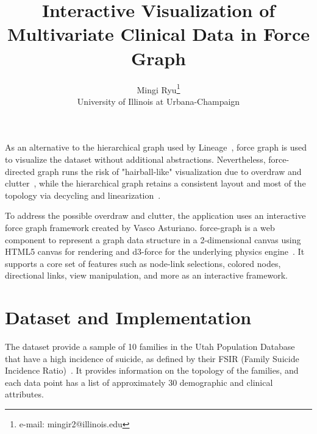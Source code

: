 \documentclass{vgtc}                          %
\title{Interactive Visualization of Multivariate Clinical Data in Force Graph}
\author{Mingi Ryu\thanks{e-mail: mingir2@illinois.edu}\\ %
        \scriptsize University of Illinois at Urbana-Champaign %
     \parbox{1.4in}{\scriptsize \centering}}
\begin{document}


\maketitle


As an alternative to the hierarchical graph used by Lineage~\cite{Nobre:2018:VMC}, force graph is used to visualize the dataset without additional abstractions. Nevertheless, force-directed graph runs the risk of "hairball-like" visualization due to overdraw and clutter~\cite{Elzen:2014:DOSA}, while the hierarchical graph retains a consistent layout and most of the topology via decycling and linearization~\cite{Nobre:2018:VMC}.

To address the possible overdraw and clutter, the application uses an interactive force graph framework created by Vasco Asturiano. force-graph is a web component to represent a graph data structure in a 2-dimensional canvas using HTML5 canvas for rendering and d3-force  for the underlying physics engine~\cite{Asturiano:2018:FG}. It supports a core set of features such as node-link selections, colored nodes, directional links, view manipulation, and more as an interactive framework.  


\section{Dataset and Implementation}

The dataset provide a sample of 10 families in the Utah Population Database that have a high incidence of suicide, as defined by their FSIR (Family Suicide Incidence Ratio)~\cite{BioVis:2020:WS}. It provides information on the topology of the families, and each data point has a list of approximately 30 demographic and clinical attributes.
\end{document}
